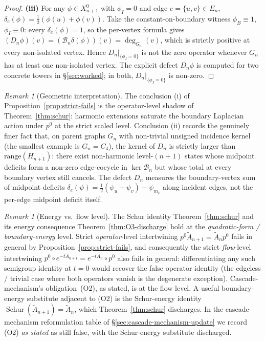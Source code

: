 \documentclass[11pt]{article}
\theoremstyle{plain}
\theoremstyle{definition}
\theoremstyle{remark}
\newtheorem{remark}[theorem]{Remark}
\newcommand{\Schur}{\operatorname{Schur}}
\begin{document}
\begin{proof}
\smallskip
\textbf{(iii)} For any $\phi \in X_{n+1}^{0}$ with $\phi_I = 0$ and
edge $e = \{u, v\} \in E_n$, $\delta_e(\phi) = \tfrac12(\phi(u) + \phi(v))$.
Take the constant-on-boundary witness $\phi_B \equiv 1$,
$\phi_I \equiv 0$: every $\delta_e(\phi) = 1$, so the per-vertex
formula gives $(D_n \phi)(v) = (\mathcal{B}_n \delta(\phi))(v) = \deg_{G_n}(v)$,
which is strictly positive at every non-isolated vertex. Hence
$D_n |_{\{\phi_I = 0\}}$ is not the zero operator whenever $G_n$
has at least one non-isolated vertex. The explicit defect
$D_n \phi$ is computed for two concrete towers in \S\ref{sec:worked};
in both, $D_n |_{\{\phi_I = 0\}}$ is non-zero.
\end{proof}

\begin{remark}[Geometric interpretation]\label{rem:harmonic-zero}
The conclusion (i) of Proposition~\ref{prop:strict-fails} is the
operator-level shadow of Theorem~\ref{thm:schur}: harmonic
extensions saturate the boundary Laplacian action under $p^{0}$ at
the strict scaled level. Conclusion (ii) records the genuinely
finer fact that, on parent graphs $G_n$ with non-trivial unsigned
incidence kernel (the smallest example is $G_n = C_4$), the kernel
of $D_n$ is strictly larger than $\mathrm{range}(H_{n+1})$: there
exist non-harmonic level-$(n+1)$ states whose midpoint deficits
form a non-zero edge-cocycle in $\ker \mathcal{B}_n$ but whose total at every
boundary vertex still cancels. The defect $D_n$ measures the
boundary-vertex sum of midpoint deficits
$\delta_e(\psi) = \tfrac12(\psi_u + \psi_v) - \psi_{m_e}$ along
incident edges, not the per-edge midpoint deficit itself.
\end{remark}

\begin{remark}[Energy vs.\ flow level]
The Schur identity Theorem~\ref{thm:schur} and its energy
consequence Theorem~\ref{thm:O3-discharge} hold at the
\emph{quadratic-form / boundary-energy} level. Strict
\emph{operator}-level intertwining
$p^{0} \widetilde A_{n+1} = \widetilde A_n p^{0}$ fails in general by
Proposition~\ref{prop:strict-fails}, and consequently the strict
\emph{flow}-level intertwining
$p^{0} \circ e^{-t \widetilde A_{n+1}} = e^{-t \widetilde A_n} \circ p^{0}$
also fails in general: differentiating any such semigroup identity
at $t = 0$ would recover the false operator identity (the
edgeless / trivial case where both operators vanish is the
degenerate exception). Cascade-mechanism's
obligation~(O2), as stated, is at the flow level. A useful
boundary-energy substitute adjacent to (O2) is the Schur-energy
identity $\Schur(\widetilde A_{n+1}) = \widetilde A_n$, which
Theorem~\ref{thm:schur} discharges. In the cascade-mechanism
reformulation table of \S\ref{sec:cascade-mechanism-update} we
record (O2) \emph{as stated} as still false, with the Schur-energy
substitute discharged.
\end{remark}
\end{document}
